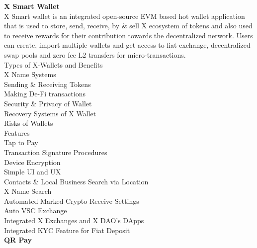 \documentclass[letterpaper,11pt]{article}
\begin{document}
\textbf{X Smart Wallet}\\

X Smart wallet is an integrated open-source EVM based hot wallet application that is used to store, send, receive, by \& sell X ecosystem of tokens and also used to receive rewards for their contribution towards the decentralized network. Users can create, import multiple wallets and get access to fiat-exchange, decentralized swap pools and zero fee L2 transfers for micro-transactions. \\

Types of X-Wallets and Benefits\\

X Name Systems\\

Sending \& Receiving Tokens\\

Making De-Fi transactions\\

Security \& Privacy of Wallet\\

Recovery Systems of X Wallet\\

Risks of Wallets\\

Features\\

Tap to Pay\\

Transaction Signature Procedures\\

Device Encryption\\

Simple UI and UX\\

Contacts \& Local Business Search via Location\\

X Name Search\\

Automated Marked-Crypto Receive Settings\\

Auto VSC Exchange\\

Integrated X Exchanges and X DAO's DApps\\

Integrated KYC Feature for Fiat Deposit\\

\textbf{QR Pay}\\
\end{document}
